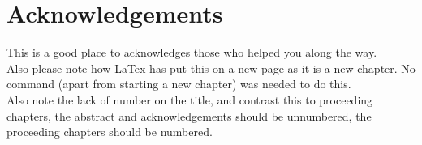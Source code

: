 \chapter*{Acknowledgements} %
This is a good place to acknowledges those who helped you along the way. \\Also please note how LaTex has put this on a new page as it is a new chapter. No command (apart from starting a new chapter) was needed to do this. \\Also note the lack of number on the title, and contrast this to proceeding chapters, the abstract and acknowledgements should be unnumbered, the proceeding chapters should be numbered.